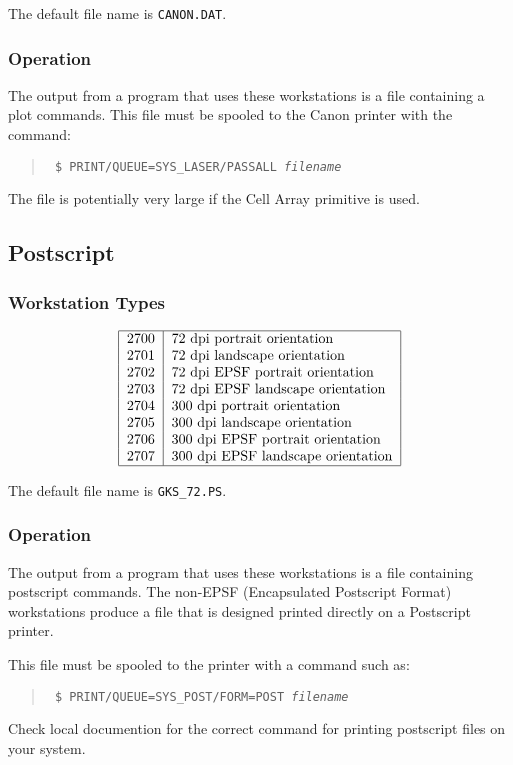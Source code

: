 The default file name is {\tt CANON.DAT}.

\subsubsection{Operation}
The output from a program that uses these workstations is a file containing a
plot commands.
This file must be spooled to the Canon printer with the command:
\begin{quote}\tt
\$ PRINT/QUEUE=SYS\_LASER/PASSALL  {\em filename}
\end{quote}

The file is potentially very large if the Cell Array primitive is used.

\subsection{Postscript}
\label{ps}
\subsubsection{Workstation Types}
\[\begin{tabular}{|l|l|}\hline
2700 &72 dpi portrait orientation\\
2701 &72 dpi landscape orientation\\
2702 &72 dpi EPSF portrait orientation\\
2703 &72 dpi EPSF landscape orientation\\
2704 &300 dpi portrait orientation\\
2705 &300 dpi landscape orientation\\
2706 &300 dpi EPSF portrait orientation\\
2707 &300 dpi EPSF landscape orientation\\\hline
\end{tabular}\]

The default file name is {\tt GKS\_72.PS}.

\subsubsection{Operation}
The output from a program that uses these workstations is a file containing
postscript commands. The non-EPSF (Encapsulated Postscript Format) 
workstations produce a file that is designed printed directly on a Postscript
printer.

This file must be spooled to the printer with a command such as:
\begin{quote}\tt
\$ PRINT/QUEUE=SYS\_POST/FORM=POST  {\em filename}
\end{quote}
Check local documention for the correct command for printing postscript files
on your system.

